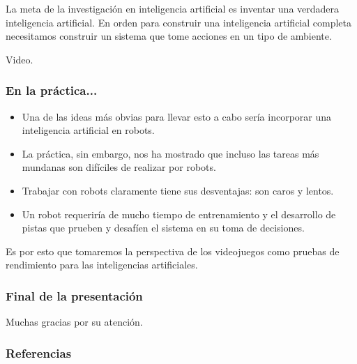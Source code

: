 \documentclass[aspectratio=169]{beamer}
\begin{document}
\begin{frame}
\begin{center}
La meta de la investigación en inteligencia artificial es inventar una
verdadera inteligencia artificial. En orden para construir una inteligencia
artificial completa necesitamos construir un sistema que tome acciones en un
tipo de ambiente.
\end{center}
\end{frame}

\begin{frame}
\begin{center}
Video.
\end{center}
\end{frame}

\begin{frame}
\frametitle{En la práctica...}
\begin{itemize}[<+->]
\item Una de las ideas más obvias para llevar esto a cabo sería incorporar una inteligencia artificial en robots.
\item La práctica, sin embargo, nos ha mostrado que incluso las tareas más mundanas son difíciles de realizar por robots. 
\item Trabajar con robots claramente tiene sus desventajas: son caros y lentos.
\item Un robot requeriría de mucho tiempo de entrenamiento y el desarrollo de pistas que prueben y desafíen el sistema en su toma de decisiones.
\end{itemize}
\end{frame}

\begin{frame}
\begin{center}
Es por esto que tomaremos la perspectiva de los videojuegos como pruebas de rendimiento para las inteligencias artificiales.
\end{center}
\end{frame}

\begin{frame}
\frametitle{Final de la presentación}

Muchas gracias por su atención.
\end{frame}

\begin{frame}
\frametitle{Referencias}
\end{frame}
\end{document}
